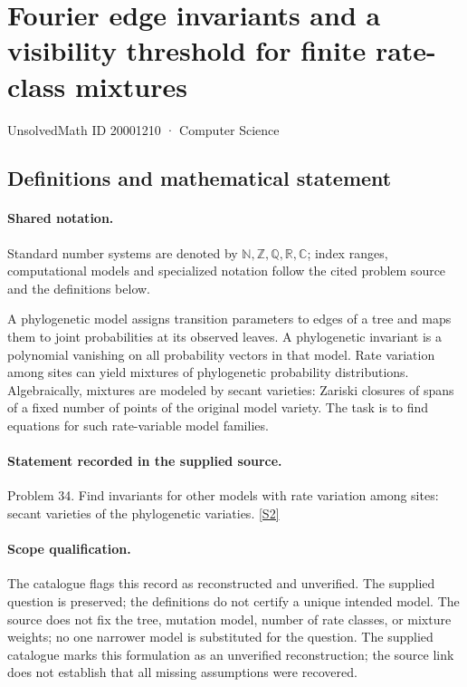 \documentclass[11pt]{article}
\newcommand{\sref}[2]{\hyperlink{source:#1:#2}{[S#2]}}
\begin{document}
\setcounter{section}{20001209}
\section{Fourier edge invariants and a visibility threshold for finite rate-class mixtures}\label{20001210}
{\small\sffamily UnsolvedMath ID 20001210 · Computer Science}
\subsection{Definitions and mathematical statement}

\paragraph{Shared notation.}Standard number systems are denoted by $\mathbb N,\mathbb Z,\mathbb Q,\mathbb R,\mathbb C$; index ranges, computational models and specialized notation follow the cited problem source and the definitions below.


A phylogenetic model assigns transition parameters to edges of a tree and maps them to joint probabilities at its observed leaves. A phylogenetic invariant is a polynomial vanishing on all probability vectors in that model. Rate variation among sites can yield mixtures of phylogenetic probability distributions. Algebraically, mixtures are modeled by secant varieties: Zariski closures of spans of a fixed number of points of the original model variety. The task is to find equations for such rate-variable model families.
\paragraph{Statement recorded in the supplied source.}
Problem 34. Find invariants for other models with rate variation among sites: secant varieties of the phylogenetic variaties. \sref{20001210}{2}
\paragraph{Scope qualification.}
The catalogue flags this record as reconstructed and unverified. The supplied question is preserved; the definitions do not certify a unique intended model. The source does not fix the tree, mutation model, number of rate classes, or mixture weights; no one narrower model is substituted for the question.
The supplied catalogue marks this formulation as an unverified reconstruction; the source link does not establish that all missing assumptions were recovered.
\end{document}
